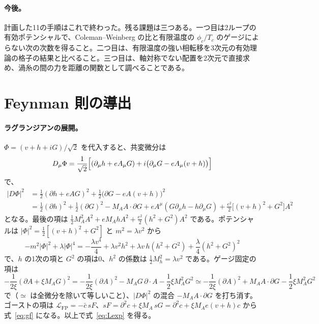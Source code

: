 \documentclass[a4paper,10pt]{ltjsarticle}
\begin{document}
\paragraph{今後。}計画した11の手順はこれで終わった。残る課題は三つある。一つ目は2ループの有効ポテンシャルで、Coleman--Weinberg の比と有限温度の $\phi_c/T_c$ のゲージによらない次の次数を得ること。二つ目は、有限温度の強い相転移を3次元の有効理論の格子の結果と比べること。三つ目は、軸対称でない配置を2次元で直接求め、渦糸の間の力を距離の関数として調べることである。

\appendix

\section{Feynman 則の導出}\label{app:rules}

\paragraph{ラグランジアンの展開。}$\Phi=(v+h+iG)/\sqrt2$ を代入すると、共変微分は
\begin{equation*}
D_\mu\Phi=\frac1{\sqrt2}\Bigl[(\partial_\mu h+eA_\mu G)+i\bigl(\partial_\mu G-eA_\mu(v+h)\bigr)\Bigr]
\end{equation*}
で、
\begin{equation*}
\begin{aligned}
|D\Phi|^2&=\frac12(\partial h+eAG)^2+\frac12\bigl(\partial G-eA(v+h)\bigr)^2\\
&=\frac12(\partial h)^2+\frac12(\partial G)^2-M_AA\cdot\partial G+eA^\mu(G\partial_\mu h-h\partial_\mu G)+\frac{e^2}2\bigl[(v+h)^2+G^2\bigr]A^2
\end{aligned}
\end{equation*}
となる。最後の項は $\frac12M_A^2A^2+eM_AhA^2+\frac{e^2}2(h^2+G^2)A^2$ である。ポテンシャルは $|\Phi|^2=\frac12[(v+h)^2+G^2]$ と $m^2=\lambda v^2$ から
\begin{equation*}
-m^2|\Phi|^2+\lambda|\Phi|^4=-\frac{\lambda v^4}4+\lambda v^2h^2+\lambda v\,h(h^2+G^2)+\frac\lambda4(h^2+G^2)^2
\end{equation*}
で、$h$ の1次の項と $G^2$ の項は0、$h^2$ の係数は $\frac12M_h^2=\lambda v^2$ である。ゲージ固定の項は
\begin{equation*}
-\frac1{2\xi}(\partial A+\xi M_AG)^2=-\frac1{2\xi}(\partial A)^2-M_AG\,\partial\cdot A-\frac12\xi M_A^2G^2
\simeq-\frac1{2\xi}(\partial A)^2+M_AA\cdot\partial G-\frac12\xi M_A^2G^2
\end{equation*}
で（$\simeq$ は全微分を除いて等しいこと）、$|D\Phi|^2$ の混合 $-M_AA\cdot\partial G$ を打ち消す。ゴーストの項は $\mathcal L_{\mathrm{FP}}=-\bar c\,sF$、$sF=\partial^2c+\xi M_A\,sG=\partial^2c+\xi M_Ae(v+h)c$ から式~\eqref{eq:gf} になる。以上で式~\eqref{eq:Lexp} を得る。
\end{document}

